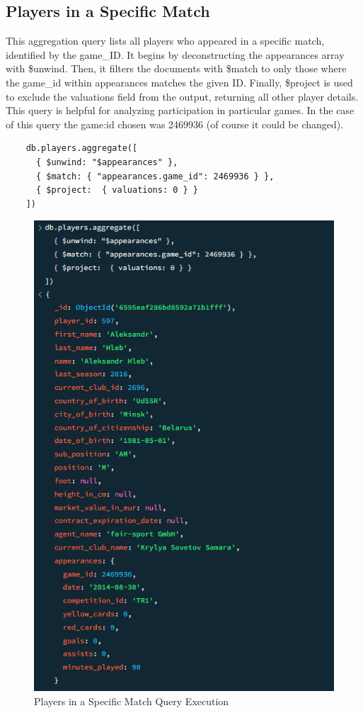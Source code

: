 \documentclass{Configuration_Files/PoliMi3i_thesis}
\begin{document}
\subsection{Players in a Specific Match}
This aggregation query lists all players who appeared in a specific match, identified by the game\_ID. It begins by deconstructing the appearances array with \$unwind. Then, it filters the documents with \$match to only those where the game\_id within appearances matches the given ID. Finally, \$project is used to exclude the valuations field from the output, returning all other player details. This query is helpful for analyzing participation in particular games. In the case of this query the game:id chosen was 2469936 (of course it could be changed).

\begin{verbatim}
    db.players.aggregate([
      { $unwind: "$appearances" },
      { $match: { "appearances.game_id": 2469936 } },
      { $project:  { valuations: 0 } }
    ])
\end{verbatim}
\begin{figure}[htbp]
    \centering
    \includegraphics[scale=1]{Images/Queries/Players_in_game/pg.png}
    \caption{Players in a Specific Match Query Execution}
\end{figure}
\end{document}
